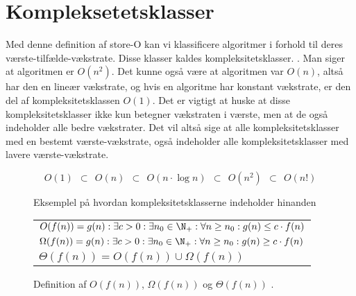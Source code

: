 \section{Kompleksetetsklasser}
\label{sec:Kompleksetetsklasser}

Med denne definition af store-O kan vi klassificere algoritmer i forhold til deres værste-tilfælde-vækstrate. Disse klasser kaldes kompleksitetsklasser. . Man siger at algoritmen er $O(n^2)$. Det kunne også være at algoritmen var $O(n)$, altså har den en lineær vækstrate, og hvis en algoritme har konstant vækstrate, er den del af kompleksitetsklassen $O(1)$. Det er vigtigt at huske at disse kompleksitetsklasser ikke kun betegner vækstraten i værste, men at de også indeholder alle bedre vækstrater. Det vil altså sige at alle kompleksitetsklasser med en bestemt værste-vækstrate, også indeholder alle kompleksitetsklasser med lavere værste-vækstrate. 

\begin{figure}
	\begin{center}
		$$O(1) \:\:\subset\:\: O(n) \:\:\subset\:\: O(n \cdot \log n) \:\:\subset\:\: O(n^2) \:\:\subset\:\: O(n!)$$
	\end{center}
	\caption{Eksemplel på hvordan kompleksitetsklasserne indeholder hinanden}
	\label{fig:kompleksitetsklasserne-indeholder-hinanden}
\end{figure}



\begin{figure}
	\begin{center}
		\padtable
		\begin{tabular}{l}
			\hline
			$O(f(n)) = {g(n): \exists c > 0: \exists n_0 \in \N_+: \forall n \geq n_0: g(n) \leq c \cdot f(n)}$\\
			$\Omega (f(n)) = {g(n): \exists c > 0: \exists n_0 \in \N_+: \forall n \geq n_0: g(n) \geq c \cdot f(n)}$\\
			$\Theta (f(n)) = O(f(n)) \cup \Omega (f(n))$\\
			\hline
		\end{tabular}
	\end{center}
	\caption{Definition af $O(f(n))$, $\Omega (f(n))$ og $\Theta (f(n))$ \cite[s. 26]{aogd}.}
	\label{fig:Store-O definition}
\end{figure}

